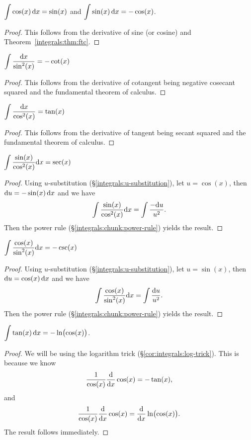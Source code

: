  $\displaystyle{\int \cos(x)\,\mathrm{d}x = \sin(x)}$
and $\displaystyle{\int \sin(x)\,\mathrm{d}x = -\cos(x)}$.

\begin{proof}
This follows from the derivative of sine (or cosine) and Theorem~\ref{integrals:thm:ftc}.
\end{proof}

\M $\displaystyle{\int \frac{\mathrm{d}x}{\sin^{2}(x)} = -\cot(x)}$

\begin{proof}
This follows from the derivative of cotangent being negative cosecant
squared and the fundamental theorem of calculus.
\end{proof}

\M $\displaystyle{\int \frac{\mathrm{d}x}{\cos^{2}(x)} = \tan(x)}$

\begin{proof}
This follows from the derivative of tangent being secant squared and the fundamental theorem
of calculus.
\end{proof}

\M $\displaystyle{\int \frac{\sin(x)}{\cos^{2}(x)}\mathrm{d}x = \sec(x)}$

\begin{proof}
Using $u$-substitution (\S\ref{integrals:u-substitution}),
let $u=\cos(x)$, then $\mathrm{d} u=-\sin(x)\,\mathrm{d} x$ and we have
\begin{equation}
\int \frac{\sin(x)}{\cos^{2}(x)}\mathrm{d} x=\int\frac{-\mathrm{d} u}{u^{2}}.
\end{equation}
Then the power rule (\S\ref{integrals:chunk:power-rule}) yields the result.
\end{proof}

\M $\displaystyle{\int \frac{\cos(x)}{\sin^{2}(x)}\mathrm{d}x = -\csc(x)}$

\begin{proof}
Using $u$-substitution (\S\ref{integrals:u-substitution}),
let $u=\sin(x)$, then $\mathrm{d} u=\cos(x)\,\mathrm{d} x$ and we have
\begin{equation}
\int \frac{\cos(x)}{\sin^{2}(x)}\mathrm{d} x=\int\frac{\mathrm{d} u}{u^{2}}.
\end{equation}
Then the power rule (\S\ref{integrals:chunk:power-rule}) yields the result.
\end{proof}

\M $\displaystyle{\int \tan(x)\,\mathrm{d}x = -\ln\bigl(\cos(x)\bigr)}$.

\begin{proof}
We will be using the logarithm trick (\S\ref{cor:integrals:log-trick}).
This is because we know
\begin{equation}
\frac{1}{\cos(x)}\frac{\mathrm{d}}{\mathrm{d} x}\cos(x) = -\tan(x),
\end{equation}
and
\begin{equation}
\frac{1}{\cos(x)}\frac{\mathrm{d}}{\mathrm{d} x}\cos(x) = \frac{\mathrm{d}}{\mathrm{d} x}\ln\bigl(\cos(x)\bigr).
\end{equation}
The result follows immediately.
\end{proof}

